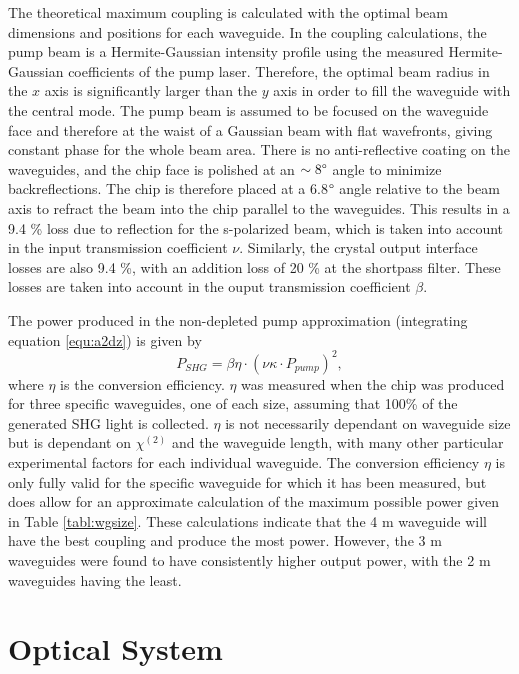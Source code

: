\documentclass[9pt,twocolumn,twoside]{pnas-new}
\begin{document}
The theoretical maximum coupling is calculated with the optimal beam dimensions and positions for each waveguide. In the coupling calculations, the pump beam is a Hermite-Gaussian intensity profile using the measured Hermite-Gaussian coefficients of the pump laser. Therefore, the optimal beam radius in the $x$ axis is significantly larger than the $y$ axis in order to fill the waveguide with the central mode. The pump beam is assumed to be focused on the waveguide face and therefore at the waist of a Gaussian beam with flat wavefronts, giving constant phase for the whole beam area. There is no anti-reflective coating on the waveguides, and the chip face is polished at an $\sim 8 \degree$ angle to minimize backreflections. The chip is therefore placed at a 6.8$\degree$  angle relative to the beam axis to refract the beam into the chip parallel to the waveguides. This results in a 9.4 \% loss due to reflection for the s-polarized beam, which is taken into account in the input transmission coefficient $\nu$. Similarly, the crystal output interface losses are also 9.4 \%, with an addition loss of 20 \% at the shortpass filter. These losses are taken into account in the ouput transmission coefficient $\beta$.

The power produced in the non-depleted pump approximation (integrating equation \ref{equ:a2dz}) is given by
\begin{equation} \label{equ:power}
	P_{SHG} = \beta \eta \cdot (\nu \kappa \cdot P_{pump})^2,
\end{equation}
where $\eta$ is the conversion efficiency. $\eta$ was measured when the chip was produced for three specific waveguides, one of each size, assuming that 100\% of the generated SHG light is collected. $\eta$ is not necessarily dependant on waveguide size but is dependant on $\chi^{(2)}$ and the waveguide length, with many other particular experimental factors for each individual waveguide. The conversion efficiency $\eta$ is only fully valid for the specific waveguide for which it has been measured, but does allow for an approximate calculation of the maximum possible power given in Table \ref{tabl:wgsize}. These calculations indicate that the 4 \textmu m waveguide will have the best coupling and produce the most power. However, the 3 \textmu m waveguides were found to have consistently higher output power, with the 2 \textmu m waveguides having the least.

\section*{Optical System}
\end{document}
